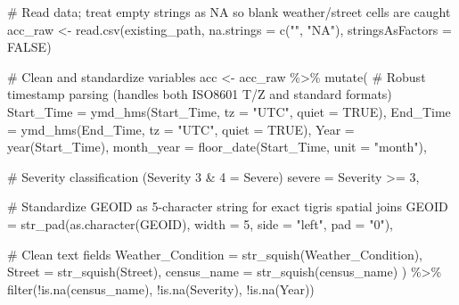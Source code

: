 \documentclass[
  letterpaper,
  DIV=11,
  numbers=noendperiod]{scrartcl}
\newenvironment{Shaded}{\begin{snugshade}}{\end{snugshade}}
\newcommand{\AttributeTok}[1]{\textcolor[rgb]{0.40,0.45,0.13}{#1}}
\newcommand{\CommentTok}[1]{\textcolor[rgb]{0.37,0.37,0.37}{#1}}
\newcommand{\ConstantTok}[1]{\textcolor[rgb]{0.56,0.35,0.01}{#1}}
\newcommand{\DecValTok}[1]{\textcolor[rgb]{0.68,0.00,0.00}{#1}}
\newcommand{\FunctionTok}[1]{\textcolor[rgb]{0.28,0.35,0.67}{#1}}
\newcommand{\NormalTok}[1]{\textcolor[rgb]{0.00,0.23,0.31}{#1}}
\newcommand{\OtherTok}[1]{\textcolor[rgb]{0.00,0.23,0.31}{#1}}
\newcommand{\SpecialCharTok}[1]{\textcolor[rgb]{0.37,0.37,0.37}{#1}}
\newcommand{\StringTok}[1]{\textcolor[rgb]{0.13,0.47,0.30}{#1}}
\begin{document}
\begin{Shaded}
\begin{Highlighting}[]
\CommentTok{\# Read data; treat empty strings as NA so blank weather/street cells are caught}
\NormalTok{acc\_raw }\OtherTok{\textless{}{-}} \FunctionTok{read.csv}\NormalTok{(existing\_path, }\AttributeTok{na.strings =} \FunctionTok{c}\NormalTok{(}\StringTok{""}\NormalTok{, }\StringTok{"NA"}\NormalTok{), }\AttributeTok{stringsAsFactors =} \ConstantTok{FALSE}\NormalTok{)}

\CommentTok{\# Clean and standardize variables}
\NormalTok{acc }\OtherTok{\textless{}{-}}\NormalTok{ acc\_raw }\SpecialCharTok{\%\textgreater{}\%}
  \FunctionTok{mutate}\NormalTok{(}
    \CommentTok{\# Robust timestamp parsing (handles both ISO8601 \textquotesingle{}T/Z\textquotesingle{} and standard formats)}
    \AttributeTok{Start\_Time =} \FunctionTok{ymd\_hms}\NormalTok{(Start\_Time, }\AttributeTok{tz =} \StringTok{"UTC"}\NormalTok{, }\AttributeTok{quiet =} \ConstantTok{TRUE}\NormalTok{),}
    \AttributeTok{End\_Time   =} \FunctionTok{ymd\_hms}\NormalTok{(End\_Time, }\AttributeTok{tz =} \StringTok{"UTC"}\NormalTok{, }\AttributeTok{quiet =} \ConstantTok{TRUE}\NormalTok{),}
    \AttributeTok{Year       =} \FunctionTok{year}\NormalTok{(Start\_Time),}
    \AttributeTok{month\_year =} \FunctionTok{floor\_date}\NormalTok{(Start\_Time, }\AttributeTok{unit =} \StringTok{"month"}\NormalTok{),}
    
    \CommentTok{\# Severity classification (Severity 3 \& 4 = Severe)}
    \AttributeTok{severe     =}\NormalTok{ Severity }\SpecialCharTok{\textgreater{}=} \DecValTok{3}\NormalTok{,}
    
    \CommentTok{\# Standardize GEOID as 5{-}character string for exact tigris spatial joins}
    \AttributeTok{GEOID      =} \FunctionTok{str\_pad}\NormalTok{(}\FunctionTok{as.character}\NormalTok{(GEOID), }\AttributeTok{width =} \DecValTok{5}\NormalTok{, }\AttributeTok{side =} \StringTok{"left"}\NormalTok{, }\AttributeTok{pad =} \StringTok{"0"}\NormalTok{),}
    
    \CommentTok{\# Clean text fields}
    \AttributeTok{Weather\_Condition =} \FunctionTok{str\_squish}\NormalTok{(Weather\_Condition),}
    \AttributeTok{Street            =} \FunctionTok{str\_squish}\NormalTok{(Street),}
    \AttributeTok{census\_name       =} \FunctionTok{str\_squish}\NormalTok{(census\_name)}
\NormalTok{  ) }\SpecialCharTok{\%\textgreater{}\%}
  \FunctionTok{filter}\NormalTok{(}\SpecialCharTok{!}\FunctionTok{is.na}\NormalTok{(census\_name), }\SpecialCharTok{!}\FunctionTok{is.na}\NormalTok{(Severity), }\SpecialCharTok{!}\FunctionTok{is.na}\NormalTok{(Year))}


\end{Highlighting}
\end{Shaded}
\end{document}
